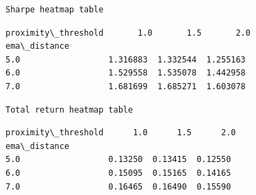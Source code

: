 \documentclass[11pt]{article}
\begin{document}
    \begin{Verbatim}[commandchars=\\\{\}]
Sharpe heatmap table
    \end{Verbatim}

    
    \begin{Verbatim}[commandchars=\\\{\}]
proximity\_threshold       1.0       1.5       2.0
ema\_distance                                     
5.0                  1.316883  1.332544  1.255163
6.0                  1.529558  1.535078  1.442958
7.0                  1.681699  1.685271  1.603078
    \end{Verbatim}

    
    \begin{Verbatim}[commandchars=\\\{\}]
Total return heatmap table
    \end{Verbatim}

    
    \begin{Verbatim}[commandchars=\\\{\}]
proximity\_threshold      1.0      1.5      2.0
ema\_distance                                  
5.0                  0.13250  0.13415  0.12550
6.0                  0.15095  0.15165  0.14165
7.0                  0.16465  0.16490  0.15590
    \end{Verbatim}

    
    \begin{center}
    \end{center}
    { \hspace*{\fill} \\}
    
\end{document}
